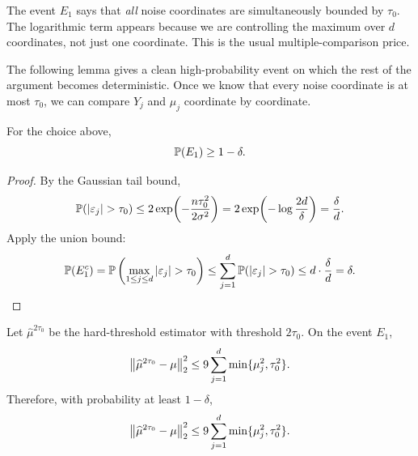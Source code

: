 \begin{remark}
The event $E_1$ says that \emph{all} noise coordinates are simultaneously bounded by $\tau_0$.
The logarithmic term appears because we are controlling the maximum over $d$ coordinates, not just one coordinate.
This is the usual multiple-comparison price.
\end{remark}

The following lemma gives a clean high-probability event on which the rest of the argument becomes deterministic.
Once we know that every noise coordinate is at most $\tau_0$, we can compare $Y_j$ and $\mu_j$ coordinate by coordinate.

\begin{lem}
For the choice above,
\[
\mathbb{P}(E_1)\ge 1-\delta.
\]
\end{lem}

\begin{proof}
By the Gaussian tail bound,
\[
\pr(|\varepsilon_j|>\tau_0)
\le
2\exp\!\left(-\frac{n\tau_0^2}{2\sigma^2}\right)
=
2\exp\!\left(-\log\frac{2d}{\delta}\right)
=
\frac{\delta}{d}.
\]
Apply the union bound:
\[
\pr(E_1^c)
=
\pr\left(\max_{1\le j\le d}|\varepsilon_j|>\tau_0\right)
\le
\sum_{j=1}^d \pr(|\varepsilon_j|>\tau_0)
\le
d\cdot \frac{\delta}{d}
=
\delta.
\]
\end{proof}


\begin{prop}
Let $\widehat\mu^{2\tau_0}$ be the hard-threshold estimator with threshold $2\tau_0$. On the event $E_1$,
\[
\left\lVert\widehat\mu^{2\tau_0}-\mu\right\rVert_2^2
\le
9\sum_{j=1}^d \min\{\mu_j^2,\tau_0^2\}.
\]
Therefore, with probability at least $1-\delta$,
\[
\left\lVert\widehat\mu^{2\tau_0}-\mu\right\rVert_2^2
\le
9\sum_{j=1}^d \min\{\mu_j^2,\tau_0^2\}.
\]
\end{prop}

